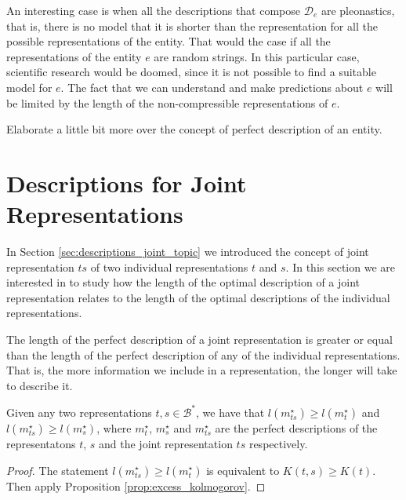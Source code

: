An interesting case is when all the descriptions that compose $\mathcal{D}_e$ are pleonastics, that is, there is no model that it is shorter than the representation for all the possible representations of the entity. That would the case if all the representations of the entity $e$ are random strings. In this particular case, scientific research would be doomed, since it is not possible to find a suitable model for $e$. The fact that we can understand and make predictions about $e$ will be limited by the length of the non-compressible representations of $e$.

{\color{red} Elaborate a little bit more over the concept of perfect description of an entity.}

%
%

\section{Descriptions for Joint Representations}
\label{sec:description_joint_represenation}

In Section \ref{sec:descriptions_joint_topic} we introduced the concept of joint representation $ts$ of two individual representations $t$ and $s$. In this section we are interested in to study how the length of the optimal description of a joint representation relates to the length of the optimal descriptions of the individual representations.

The length of the perfect description of a joint representation is greater or equal than the length of the perfect description of any of the individual representations. That is, the more information we include in a representation, the longer will take to describe it. 

\begin{proposition}
\label{prop:joint_length}
Given any two representations $t,s \in \mathcal{B}^\ast$, we have that $l \left( m_{ts}^{\star} \right) \geq l \left( m_{t}^{\star} \right)$ and $l \left( m_{ts}^{\star} \right) \geq l \left( m_{s}^{\star} \right)$, where $m_{t}^{\star}$, $m_{s}^{\star}$ and $m_{ts}^{\star}$ are the perfect descriptions of the representatons $t$, $s$ and the joint representation $ts$ respectively.
\end{proposition}
\begin{proof}
The statement $l \left( m_{ts}^{\star} \right) \geq l \left( m_{t}^{\star} \right)$ is equivalent to $K(t,s) \geq K(t)$. Then apply Proposition \ref{prop:excess_kolmogorov}.
\end{proof}

